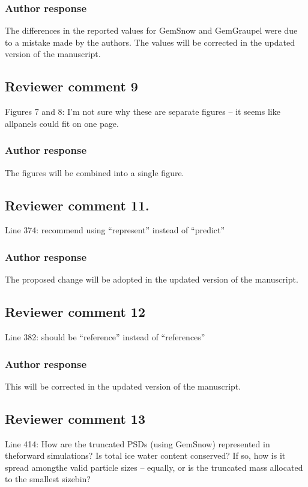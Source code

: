 \documentclass[11pt]{scrartcl}
\begin{document}
\subsubsection*{Author response}

The differences in the reported values for GemSnow and GemGraupel were due to a mistake
made by the authors. The values will be corrected in the updated version of the manuscript.

\subsection*{Reviewer comment 9}
Figures 7 and 8:  I’m not sure why these are separate figures – it seems like allpanels could fit on one page.

\subsubsection*{Author response}
The figures will be combined into a single figure.

\subsection*{Reviewer comment 11.}
 Line 374: recommend using “represent” instead of “predict”

\subsubsection*{Author response}
The proposed change will be adopted in the updated version of the manuscript.

\subsection*{Reviewer comment 12}
 Line 382: should be “reference” instead of “references”

\subsubsection*{Author response}
This will be corrected in the updated version of the manuscript.

\subsection*{Reviewer comment 13}

Line  414:  How  are  the  truncated  PSDs  (using  GemSnow)  represented  in  theforward simulations? Is total ice water content conserved? If so, how is it spread amongthe valid particle sizes – equally, or is the truncated mass allocated to the smallest sizebin?
\end{document}
